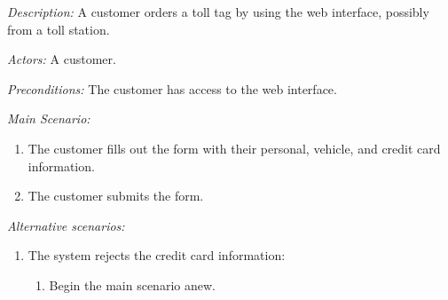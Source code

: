 \textit {Description: } A customer orders a toll tag by using the web interface, possibly from a toll station.

\textit {Actors: } A customer.

\textit {Preconditions: } The customer has access to the web interface.

\textit{Main Scenario: }

\begin{enumerate}
	\item The customer fills out the form with their personal, vehicle, and credit card information.
	\item The customer submits the form.
\end{enumerate}

\textit{Alternative scenarios: }

\begin{enumerate}
	\item The system rejects the credit card information:
	\begin{enumerate}
		\item Begin the main scenario anew.
	\end{enumerate}
\end{enumerate}